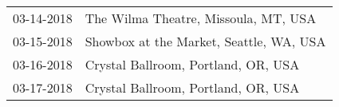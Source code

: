 \begin{supertabular}{ll}
 03-14-2018 &     The Wilma Theatre, Missoula, MT, USA \\
 03-15-2018 &  Showbox at the Market, Seattle, WA, USA \\
 03-16-2018 &      Crystal Ballroom, Portland, OR, USA \\
 03-17-2018 &      Crystal Ballroom, Portland, OR, USA \\
\end{supertabular}
